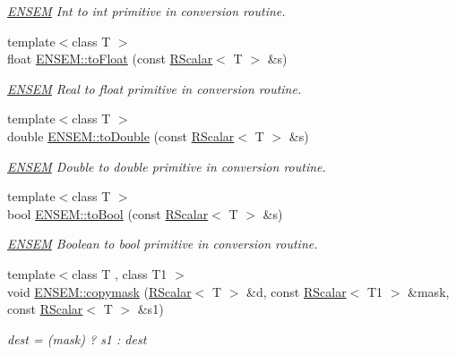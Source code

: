 \begin{DoxyCompactItemize}
\begin{DoxyCompactList}\small\item\em \mbox{\hyperlink{namespaceENSEM}{E\+N\+S\+EM}} Int to int primitive in conversion routine. \end{DoxyCompactList}\item 
{\footnotesize template$<$class T $>$ }\\float \mbox{\hyperlink{group__rscalar_gad6e25c9e461f462a45e20d34e29165c9}{E\+N\+S\+E\+M\+::to\+Float}} (const \mbox{\hyperlink{classENSEM_1_1RScalar}{R\+Scalar}}$<$ T $>$ \&s)
\begin{DoxyCompactList}\small\item\em \mbox{\hyperlink{namespaceENSEM}{E\+N\+S\+EM}} Real to float primitive in conversion routine. \end{DoxyCompactList}\item 
{\footnotesize template$<$class T $>$ }\\double \mbox{\hyperlink{group__rscalar_gadb0411ad1a014fd37c36439881c1e2dc}{E\+N\+S\+E\+M\+::to\+Double}} (const \mbox{\hyperlink{classENSEM_1_1RScalar}{R\+Scalar}}$<$ T $>$ \&s)
\begin{DoxyCompactList}\small\item\em \mbox{\hyperlink{namespaceENSEM}{E\+N\+S\+EM}} Double to double primitive in conversion routine. \end{DoxyCompactList}\item 
{\footnotesize template$<$class T $>$ }\\bool \mbox{\hyperlink{group__rscalar_ga84465303bb9b882734bb3c44dff8d024}{E\+N\+S\+E\+M\+::to\+Bool}} (const \mbox{\hyperlink{classENSEM_1_1RScalar}{R\+Scalar}}$<$ T $>$ \&s)
\begin{DoxyCompactList}\small\item\em \mbox{\hyperlink{namespaceENSEM}{E\+N\+S\+EM}} Boolean to bool primitive in conversion routine. \end{DoxyCompactList}\item 
{\footnotesize template$<$class T , class T1 $>$ }\\void \mbox{\hyperlink{group__rscalar_ga2bfebcfc9a340228eb6b4449967f1fa0}{E\+N\+S\+E\+M\+::copymask}} (\mbox{\hyperlink{classENSEM_1_1RScalar}{R\+Scalar}}$<$ T $>$ \&d, const \mbox{\hyperlink{classENSEM_1_1RScalar}{R\+Scalar}}$<$ T1 $>$ \&mask, const \mbox{\hyperlink{classENSEM_1_1RScalar}{R\+Scalar}}$<$ T $>$ \&s1)
\begin{DoxyCompactList}\small\item\em dest = (mask) ? s1 \+: dest \end{DoxyCompactList}\item 

\end{DoxyCompactItemize}
